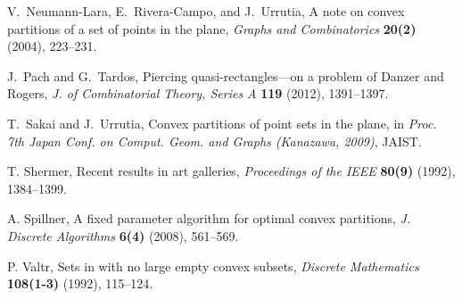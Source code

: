 \documentclass[11pt]{article}
\begin{document}
\begin{thebibliography}{99}
V.~Neumann-Lara, E.~Rivera-Campo, and J.~Urrutia,
A note on convex partitions of a set of points in the plane,
\emph{Graphs and Combinatorics}  \textbf{20(2)} (2004), 223--231.

J.~Pach and G.~Tardos,
Piercing quasi-rectangles---on a problem of Danzer and Rogers,
\emph{J. of Combinatorial Theory, Series A} \textbf{119} (2012),
1391--1397.

T.~Sakai and J.~Urrutia,
Convex partitions of point sets in the plane,
in \emph{Proc. 7th Japan Conf. on Comput. Geom. and Graphs
(Kanazawa, 2009)}, JAIST.

T. Shermer,
Recent results in art galleries,
\emph{Proceedings of the IEEE} \textbf{80(9)} (1992), 1384--1399.

A. Spillner,
A fixed parameter algorithm for optimal convex partitions,
\emph{J. Discrete Algorithms} \textbf{6(4)}  (2008), 561--569.

P. Valtr,
Sets in  with no large empty convex subsets,
\emph{Discrete Mathematics} \textbf{108(1-3)} (1992), 115--124.

\end{thebibliography}
\end{document}
